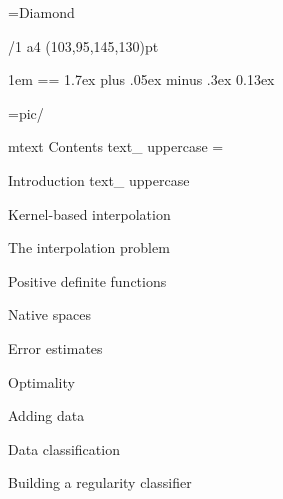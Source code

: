 \useOpTeX  %


\hyperlinks \Black \Black
{}

\enlang
\fontfam[BaskervilleMT]
\fontfam[EBGaramond]
\fontfam[TypewriterMT]
\BaskervilleMT
\typosize[12.27/14.63]
\fontdef\rmfixex{\rm}\fontdef\itfixed{\it}\fontdef\bffixed{\bf}\fontdef\bifixed{\bi}

\font\symbols=Diamond %
\def\QED{\hbox{\symbols\resizethefont \,❖}}
\famvardef{}
\famvardef{}
\famvardef\tt{\TypewriterMT{}\typoscale[870/]\rm}


\margins/1 a4 (103,95,145,130)pt


\parindent 1em
\iindent=\parindent \ttindent=\parindent
\parskip 1.7ex plus .05ex minus .3ex
 0.13ex

\picdir={pic/}





\let\omtext\_mtext
\def\_mtext#1{CONTENTS}
\let\uppercase\ignoreit
\nonum\notoc\chap Contents
\let\_mtext\omtext
\let\uppercase\_uppercase
\bigskip
\maketoc
{}
\footline={}
\vfill\eject


\def\_mtext#1{INTRODUCTION}
\let\uppercase\ignoreit
\nonum\chap Introduction
\let\_mtext\omtext
\let\uppercase\_uppercase


\chap Kernel-based interpolation

\sec The interpolation problem



\sec[positivesec] Positive definite functions


\sec Native spaces


\sec[errorsec] Error estimates


\sec Optimality


\sec[addingsec] Adding data


\chap[classificationchap] Data classification

\sec[buildingsec] Building a regularity classifier


